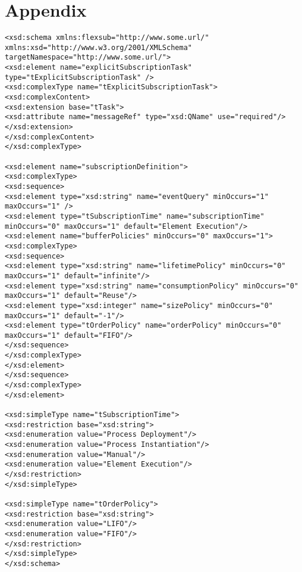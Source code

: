 \chapter{Appendix}

\begin{lstlisting}[basicstyle=\scriptsize,caption={XSD schema of the BPMN extension for flexible event subscription},label=lst:xsd-flexsub]
<xsd:schema xmlns:flexsub="http://www.some.url/" xmlns:xsd="http://www.w3.org/2001/XMLSchema" targetNamespace="http://www.some.url/">
<xsd:element name="explicitSubscriptionTask" type="tExplicitSubscriptionTask" />
<xsd:complexType name="tExplicitSubscriptionTask">
<xsd:complexContent>
<xsd:extension base="tTask">
<xsd:attribute name="messageRef" type="xsd:QName" use="required"/>
</xsd:extension>
</xsd:complexContent>
</xsd:complexType>

<xsd:element name="subscriptionDefinition">
<xsd:complexType>
<xsd:sequence>
<xsd:element type="xsd:string" name="eventQuery" minOccurs="1" maxOccurs="1" />
<xsd:element type="tSubscriptionTime" name="subscriptionTime" minOccurs="0" maxOccurs="1" default="Element Execution"/>
<xsd:element name="bufferPolicies" minOccurs="0" maxOccurs="1">
<xsd:complexType>
<xsd:sequence>
<xsd:element type="xsd:string" name="lifetimePolicy" minOccurs="0" maxOccurs="1" default="infinite"/>
<xsd:element type="xsd:string" name="consumptionPolicy" minOccurs="0" maxOccurs="1" default="Reuse"/>
<xsd:element type="xsd:integer" name="sizePolicy" minOccurs="0" maxOccurs="1" default="-1"/>
<xsd:element type="tOrderPolicy" name="orderPolicy" minOccurs="0" maxOccurs="1" default="FIFO"/>
</xsd:sequence>
</xsd:complexType>
</xsd:element>
</xsd:sequence>
</xsd:complexType>
</xsd:element>

<xsd:simpleType name="tSubscriptionTime">
<xsd:restriction base="xsd:string">
<xsd:enumeration value="Process Deployment"/>
<xsd:enumeration value="Process Instantiation"/>
<xsd:enumeration value="Manual"/>
<xsd:enumeration value="Element Execution"/>
</xsd:restriction>
</xsd:simpleType>

<xsd:simpleType name="tOrderPolicy">
<xsd:restriction base="xsd:string">
<xsd:enumeration value="LIFO"/>
<xsd:enumeration value="FIFO"/>
</xsd:restriction>
</xsd:simpleType>
</xsd:schema>
\end{lstlisting}


